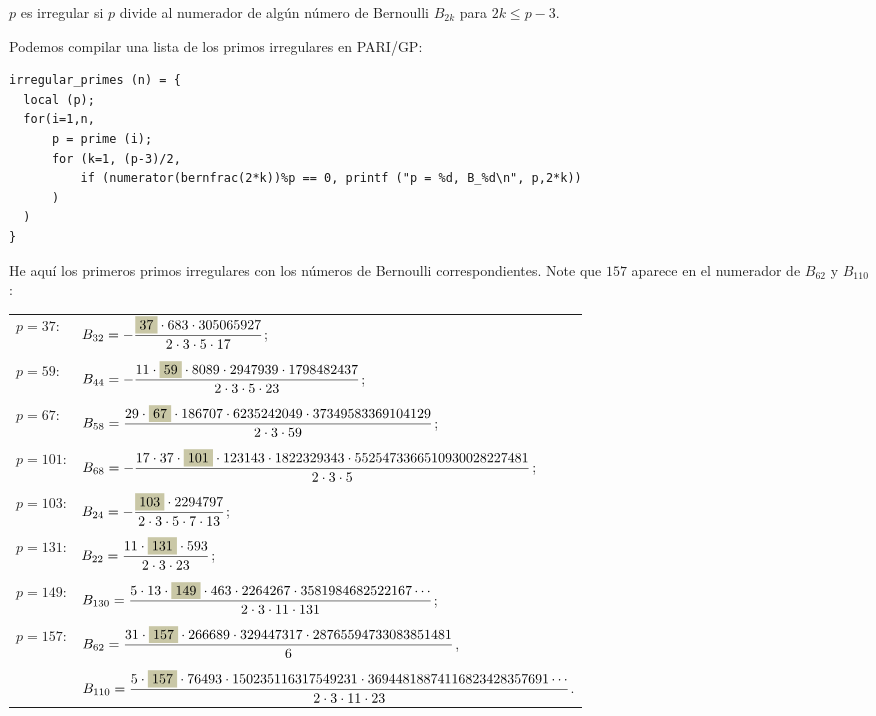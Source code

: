 \documentclass{article}
\newcommand{\highlight}[1]{\colorbox{shadecolor}{$\displaystyle #1$}}
\begin{document}
\begin{hecho*}[Kummer, 1850]
$p$ es irregular si $p$ divide al numerador de algún número de Bernoulli $B_{2k}$ para $2k \le p-3$.
\end{hecho*}

\begin{shaded}
\noindent Podemos compilar una lista de los primos irregulares en PARI/GP:

\begin{verbatim}
irregular_primes (n) = {
  local (p);
  for(i=1,n,
      p = prime (i);
      for (k=1, (p-3)/2,
          if (numerator(bernfrac(2*k))%p == 0, printf ("p = %d, B_%d\n", p,2*k))
      )
  )
}
\end{verbatim}
\end{shaded}

He aquí los primeros primos irregulares con los números de Bernoulli correspondientes. Note que $157$ aparece en el numerador de $B_{62}$ y $B_{110}$:

\begin{center}
\begin{tabular}{ll}
$p = 37$: & $\displaystyle B_{32} = -\frac{\highlight{37}\cdot 683\cdot 305065927}{2\cdot 3 \cdot 5\cdot 17}$; \\
\\
$p = 59$: & $\displaystyle B_{44} = -\frac{11\cdot \highlight{59}\cdot 8089\cdot 2947939\cdot 1798482437}{2\cdot 3\cdot 5\cdot 23}$; \\
\\
$p = 67$: & $\displaystyle B_{58} = \frac{29\cdot \highlight{67}\cdot 186707\cdot 6235242049\cdot 37349583369104129}{2\cdot 3\cdot 59}$; \\
\\
$p = 101$: & $\displaystyle B_{68} = -\frac{17\cdot 37\cdot \highlight{101}\cdot 123143\cdot 1822329343\cdot 5525473366510930028227481}{2\cdot 3\cdot 5}$; \\
\\
$p = 103$: & $\displaystyle B_{24} = -\frac{\highlight{103}\cdot 2294797}{2\cdot 3\cdot 5\cdot 7\cdot 13}$; \\
\\
$p = 131$: & $\displaystyle B_{22} = \frac{11\cdot \highlight{131}\cdot 593}{2\cdot 3\cdot 23}$; \\
\\
$p = 149$: & $\displaystyle B_{130} = \frac{5\cdot 13\cdot \highlight{149}\cdot 463\cdot 2264267\cdot 3581984682522167 \cdots}{2\cdot 3\cdot 11\cdot 131}$; \\
\\
$p = 157$: & $\displaystyle B_{62} = \frac{31\cdot \highlight{157}\cdot 266689\cdot 329447317\cdot 28765594733083851481}{6}$, \\
\\
& $\displaystyle B_{110} = \frac{5\cdot \highlight{157}\cdot 76493\cdot 150235116317549231\cdot 36944818874116823428357691\cdots}{2\cdot 3\cdot 11\cdot 23}$. \\
\end{tabular}
\end{center}
\end{document}
